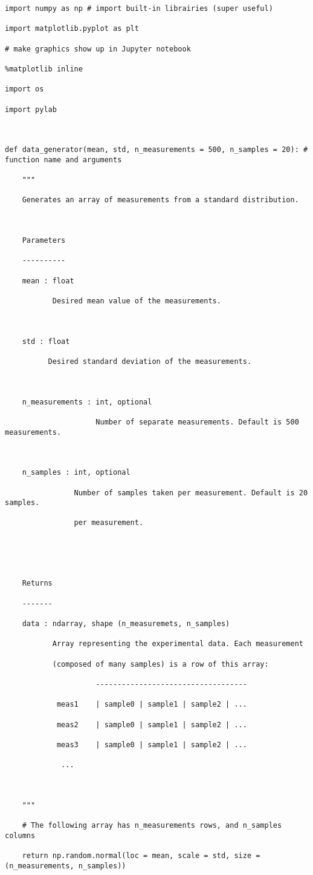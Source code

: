 \documentclass[12pt]{article}
\begin{document}
\bigskip
 
\begin{lstlisting}[frame=shadowbox]
import numpy as np # import built-in librairies (super useful)

import matplotlib.pyplot as plt

# make graphics show up in Jupyter notebook

%matplotlib inline 

import os

import pylab



def data_generator(mean, std, n_measurements = 500, n_samples = 20): # function name and arguments

    """

    Generates an array of measurements from a standard distribution.



    Parameters

    ----------

    mean : float

           Desired mean value of the measurements.

           

    std : float

          Desired standard deviation of the measurements.

          

    n_measurements : int, optional

                     Number of separate measurements. Default is 500 measurements.



    n_samples : int, optional

                Number of samples taken per measurement. Default is 20 samples. 

                per measurement.





    Returns

    -------

    data : ndarray, shape (n_measuremets, n_samples)

           Array representing the experimental data. Each measurement 

           (composed of many samples) is a row of this array:

                     -----------------------------------

            meas1    | sample0 | sample1 | sample2 | ...

            meas2    | sample0 | sample1 | sample2 | ...

            meas3    | sample0 | sample1 | sample2 | ...

             ...



    """

    # The following array has n_measurements rows, and n_samples columns

    return np.random.normal(loc = mean, scale = std, size = (n_measurements, n_samples))
\end{lstlisting}
\end{document}
